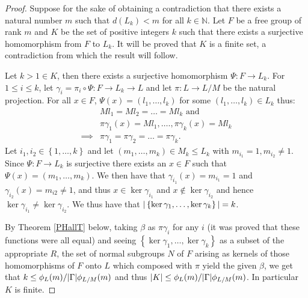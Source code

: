 \begin{proof}
    Suppose for the sake of obtaining a contradiction that there exists a natural number $m$ such that $d(L_k)<m$ for all $k \in \mathbb{N}$.
    Let $F$ be a free group of rank $m$ and $K$ be the set of positive integers $k$ such that there exists a surjective homomorphism from $F$ to $L_k$. 
    It will be proved that $K$ is a finite set, a contradiction from which the result will follow.

    Let $k > 1 \in K$, then there exists a surjective homomorphism $\Psi : F \rightarrow L_k$. For $1 \le i \le k$, let $\gamma_i = \pi_i \circ \Psi : F \rightarrow L_k \rightarrow L$ and let $\pi : L \rightarrow L/M$ be the natural projection. For all $x \in F$, $\Psi(x) = (l_1,\ldots ,l_k)$ for some $(l_1,\ldots ,l_k) \in L_k$ thus:
    \begin{align*}
        &Ml_1 = Ml_2 = \ldots  = Ml_k \text{ and } \\
        &\pi\gamma_1(x) = Ml_1, \ldots . , \pi\gamma_k(x) = Ml_k \\
        \implies &\pi\gamma_1 = \pi\gamma_2 = \ldots  = \pi\gamma_k.
    \end{align*}
    Let $i_1, i_2 \in \left\{ 1, \ldots , k \right\}$ and let $(m_1,\ldots , m_k) \in M_k \le L_k$ with $m_{i_1} = 1, m_{i_2} \ne 1.$ Since $\Psi : F \rightarrow L_k$ is surjective there exists an $x \in F$ such that $\Psi(x) = (m_1,\ldots , m_k)$. 
    We then have that $\gamma_{i_1}(x) = m_{i_1} = 1$ and $\gamma_{i_2}(x) = m_{i2} \ne 1$, and thus $x \in \ker \gamma_{i_1}$ and $x \notin \ker \gamma_{i_2}$ and hence $\ker \gamma_{i_1} \ne \ker \gamma_{i_2}$. We thus have that $| \left\{ \ker \gamma_{1}, \ldots , \ker \gamma_{k} \right\} | = k$. 
    
    By Theorem \ref{PHallT} below, taking $\beta$ as $\pi\gamma_i$ for any $i$ (it was proved that these functions were all equal) and seeing $\left\{ \ker \gamma_{1}, \ldots , \ker \gamma_{k} \right\}$ as a subset of the appropriate $R$, the set of normal subgroups $N$ of $F$ arising as kernels of those homomorphisms of $F$ onto $L$ which composed with $\pi$ yield the given $\beta$, we get that $k \le \phi_L(m)/| \Gamma |\phi_{L/M}(m)$ and thus $| K | \le \phi_L(m)/| \Gamma |\phi_{L/M}(m)$. In particular $K$ is finite.
\end{proof}